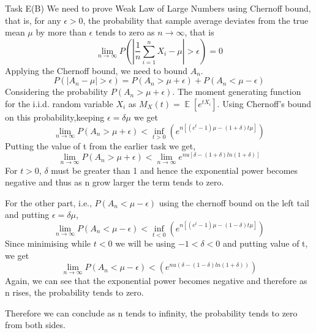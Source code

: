 \begin{task}{Task E(B)}
	We need to prove Weak Law of Large Numbers using Chernoff bound, that is, for
	any $\epsilon>0$, the probability that sample average deviates from the true
	mean $\mu$ by more than $\epsilon$ tends to zero as $n\rightarrow \infty$,
	that is
	\begin{equation}
		\lim_{n\to\infty}P(|\frac{1}{n}\sum_{i=1}^{n}X_{i}-\mu|>\epsilon)=0
	\end{equation}
	Applying the Chernoff bound, we need to bound $A_{n}$.
	\begin{equation}
		P(|A_{n}-\mu|> \epsilon )=P(A_{n}>\mu+\epsilon)+P(A_{n}<\mu - \epsilon)
	\end{equation}
	Considering the probability $P(A_{n}>\mu+\epsilon)$. The moment generating function for the i.i.d. random variable $X_{i}$ as $M_{X}(t)=\mathop{\mathbb{E}}[e^{tX_{i}}]$. Using Chernoff's bound on this probability,keeping $\epsilon=\delta\mu$ we get
	\begin{equation}
		\lim_{n\to\infty}P(A_{n}>\mu+\epsilon)< \inf_{t>0}(e^{n[(e^{t}-1)\mu - (1+\delta)t\mu]})
	\end{equation}
	Putting the value of t from the earlier task we get,
	\begin{equation}
		\lim_{n\to\infty}P(A_{n}>\mu+\epsilon)<\lim_{n\to\infty}e^{nu[\delta-(1+\delta)ln(1+\delta)]}
	\end{equation}
	For $t>0$, $\delta $ must be greater than 1 and hence the exponential power becomes negative and thus as n grow larger the term tends to zero.
	\par For the other part, i.e., $P(A_{n}<\mu - \epsilon)$ using the chernoff bound on the left tail and putting $\epsilon=\delta\mu$,
	\begin{equation}
		\lim_{n\to\infty}P(A_{n}<\mu - \epsilon)< \inf_{t<0}(e^{n[(e^{t}-1)\mu - (1 -\delta)t\mu]})
	\end{equation}
	Since minimising while $t<0$ we will be using $-1<\delta<0$ and putting value of t, we get
	\begin{equation}
		\lim_{n\to\infty}P(A_{n}<\mu - \epsilon)<(e^{nu(\delta-(1-\delta) ln(1+\delta))})
	\end{equation}
	Again, we can see that the exponential power becomes negative and therefore as n rises, the probability tends to zero.
	\par Therefore we can conclude as n tends to infinity, the probability tends to zero from both sides.
\end{task}
